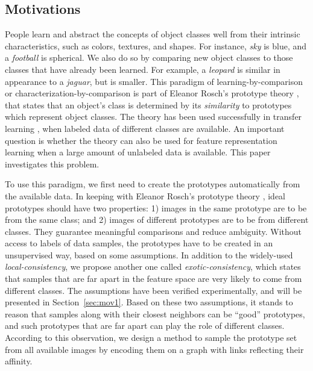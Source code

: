 \documentclass[preprint,12pt,3p]{elsarticle}
\begin{document}
\subsection{Motivations}
People learn and abstract the concepts of object classes well from
their intrinsic characteristics, such as colors, textures, and
shapes. For instance, \emph{sky} is blue, and a \emph{football} is
spherical. We also do so by comparing new object classes to those classes that
have already been learned. For example, a \emph{leopard} is similar in
appearance to a \emph{jaguar}, but is smaller. This paradigm of
learning-by-comparison or characterization-by-comparison is part of
Eleanor Rosch's prototype theory \citep{Rosch:1978}, that states that
an object's class is determined by its \emph{similarity} to prototypes
which represent object classes. The theory has been used successfully
in transfer learning \citep{Transfer:CVPR:08}, when labeled data of
different classes are available. An important question is whether the
theory can also be used for feature representation learning when a large
amount of unlabeled data is available. This paper investigates this
problem.


To use this paradigm, we first need to create the prototypes
automatically from the available data. In
keeping with Eleanor Rosch's prototype theory \citep{Rosch:1978}, ideal
prototypes should have two properties: 1) images in the same prototype
are to be from the same class; and 2) images of different
prototypes are to be from different classes. They 
guarantee meaningful comparisons and reduce ambiguity.  Without
access to labels of data samples, the prototypes have to be created in
an unsupervised way, based on some assumptions. In addition to the
widely-used \emph{local-consistency}, we propose another one called
\emph{exotic-consistency}, which states that samples that are far
apart in the feature space are very likely to come from
different classes. The assumptions have been verified
experimentally, and will be presented in Section~\ref{sec:mov1}.  Based
on these two assumptions, it stands to reason that samples along with
their closest neighbors can be ``good'' prototypes, and  such
prototypes that are far apart can play the role of different classes.  According to
this observation, we design a method to sample the prototype set from
all available images by encoding them on a graph with links
reflecting their affinity.
\end{document}
